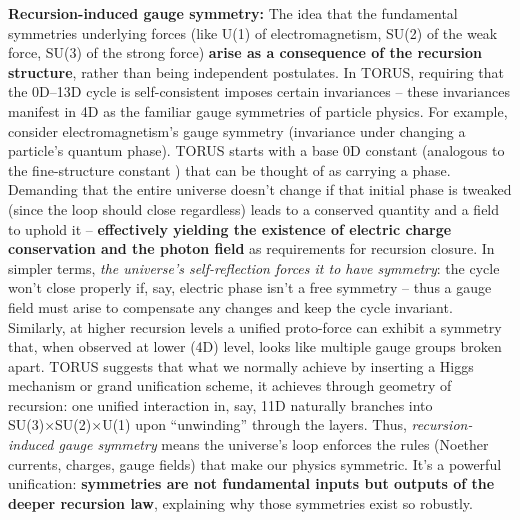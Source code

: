 \documentclass[
]{article}
\begin{document}
{\textbf{Recursion-induced gauge symmetry:} The idea that the fundamental
symmetries underlying forces (like U(1) of electromagnetism, SU(2) of
the weak force, SU(3) of the strong force)
\textbf{arise as a
consequence of the recursion structure}, rather than being independent
postulates. In TORUS, requiring that the 0D--13D cycle is
self-consistent imposes certain invariances -- these invariances
manifest in 4D as the familiar gauge symmetries of particle
physics\hspace{0pt}. For example, consider electromagnetism's gauge
symmetry (invariance under changing a particle's quantum phase). TORUS
starts with a base 0D constant (analogous to the fine-structure constant
\alpha) that can be thought of as carrying a phase. Demanding that the entire
universe doesn't change if that initial phase is tweaked (since the loop
should close regardless) leads to a conserved quantity and a field to
uphold it -- \textbf{effectively yielding the existence of electric
charge conservation and the photon field} as requirements for recursion
closure\hspace{0pt}. In simpler terms, \emph{the universe's
self-reflection forces it to have symmetry}: the cycle won't close
properly if, say, electric phase isn't a free symmetry -- thus a gauge
field must arise to compensate any changes and keep the cycle invariant.
Similarly, at higher recursion levels a unified proto-force can exhibit
a symmetry that, when observed at lower (4D) level, looks like multiple
gauge groups broken apart\hspace{0pt}. TORUS suggests that what we
normally achieve by inserting a Higgs mechanism or grand unification
scheme, it achieves through geometry of recursion: one unified
interaction in, say, 11D naturally branches into SU(3)×SU(2)×U(1) upon
``unwinding'' through the layers\hspace{0pt}. Thus,
\emph{recursion-induced gauge symmetry} means the universe's loop
enforces the rules (Noether currents, charges, gauge fields) that make
our physics symmetric. It's a powerful unification: \textbf{symmetries
are not fundamental inputs but outputs of the deeper recursion law},
explaining why those symmetries exist so robustly.

}
\end{document}
